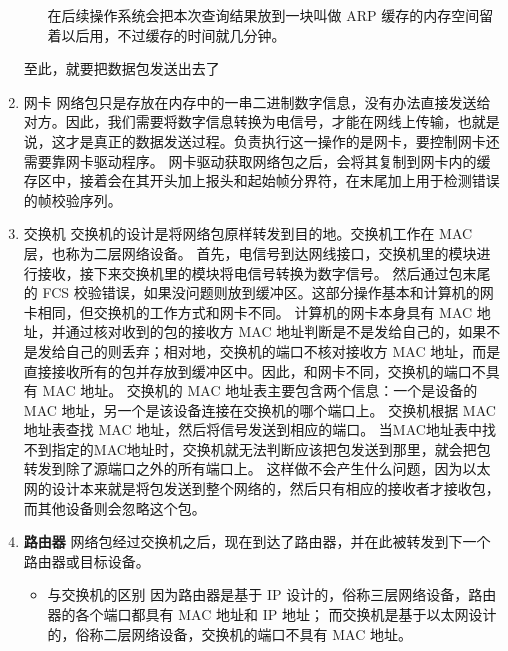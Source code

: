 \documentclass[11pt]{article}
\begin{document}
\begin{enumerate}
\begin{itemize}
在后续操作系统会把本次查询结果放到一块叫做 ARP 缓存的内存空间留着以后用，不过缓存的时间就几分钟。
\end{itemize}
至此，就要把数据包发送出去了
\item 网卡
网络包只是存放在内存中的一串二进制数字信息，没有办法直接发送给对方。因此，我们需要将数字信息转换为电信号，才能在网线上传输，也就是说，这才是真正的数据发送过程。负责执行这一操作的是网卡，要控制网卡还需要靠网卡驱动程序。
网卡驱动获取网络包之后，会将其复制到网卡内的缓存区中，接着会在其开头加上报头和起始帧分界符，在末尾加上用于检测错误的帧校验序列。
\item 交换机
交换机的设计是将网络包原样转发到目的地。交换机工作在 MAC 层，也称为二层网络设备。
首先，电信号到达网线接口，交换机里的模块进行接收，接下来交换机里的模块将电信号转换为数字信号。
然后通过包末尾的 FCS 校验错误，如果没问题则放到缓冲区。这部分操作基本和计算机的网卡相同，但交换机的工作方式和网卡不同。
计算机的网卡本身具有 MAC 地址，并通过核对收到的包的接收方 MAC 地址判断是不是发给自己的，如果不是发给自己的则丢弃；相对地，交换机的端口不核对接收方 MAC 地址，而是直接接收所有的包并存放到缓冲区中。因此，和网卡不同，交换机的端口不具有 MAC 地址。
交换机的 MAC 地址表主要包含两个信息：一个是设备的 MAC 地址，另一个是该设备连接在交换机的哪个端口上。
交换机根据 MAC 地址表查找 MAC 地址，然后将信号发送到相应的端口。
当MAC地址表中找不到指定的MAC地址时，交换机就无法判断应该把包发送到那里，就会把包转发到除了源端口之外的所有端口上。
这样做不会产生什么问题，因为以太网的设计本来就是将包发送到整个网络的，然后只有相应的接收者才接收包，而其他设备则会忽略这个包。
\item \textbf{路由器}
网络包经过交换机之后，现在到达了路由器，并在此被转发到下一个路由器或目标设备。
\begin{itemize}
\item 与交换机的区别
因为路由器是基于 IP 设计的，俗称三层网络设备，路由器的各个端口都具有 MAC 地址和 IP 地址；
而交换机是基于以太网设计的，俗称二层网络设备，交换机的端口不具有 MAC 地址。


\end{itemize}
\end{enumerate}
\end{document}

